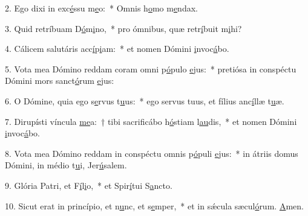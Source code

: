2. Ego dixi in exc\uline{é}ssu m\uline{e}o:~* Omnis h\uline{o}mo m\uline{e}ndax.\par 
3. Quid retríbuam D\uline{ó}m\uline{i}no,~* pro ómnibus, quæ retr\uline{í}buit m\uline{i}hi?\par 
4. Cálicem salutáris acc\uline{í}p\uline{i}am:~* et nomen Dómini \uline{i}nvoc\uline{á}bo.\par 
5. Vota mea Dómino reddam coram omni p\uline{ó}pulo \uline{e}jus:~* pretiósa in conspéctu Dómini mors sanct\uline{ó}rum \uline{e}jus:\par 
6. O Dómine, quia ego s\uline{e}rvus t\uline{u}us:~* ego servus tuus, et fílius anc\uline{í}llæ t\uline{u}æ.\par 
7. Dirupísti víncula \uline{me}a:~† tibi sacrificábo h\uline{ó}stiam l\uline{au}dis,~* et nomen Dómini \uline{i}nvoc\uline{á}bo.\par 
8. Vota mea Dómino reddam in conspéctu omnis p\uline{ó}puli \uline{e}jus:~* in átriis domus Dómini, in médio t\uline{u}i, Jer\uline{ú}salem.\par 
9. Glória Patri, et F\uline{í}l\uline{i}o,~* et Spir\uline{í}tui S\uline{a}ncto.\par 
10. Sicut erat in princípio, et n\uline{u}nc, et s\uline{e}mper,~* et in sǽcula sæcul\uline{ó}rum. \uline{A}men.\par 
